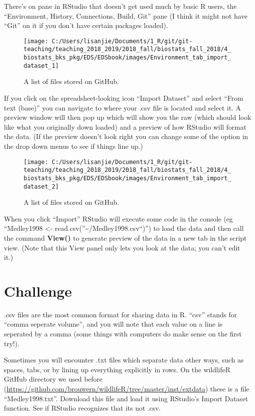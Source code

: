 \documentclass[]{book}
\theoremstyle{definition}
\theoremstyle{definition}
\theoremstyle{definition}
\theoremstyle{remark}
\begin{document}
There's on pane in RStudio that doesn't get used much by basic R users,
the ``Environment, History, Connections, Build, Git'' pane (I think it
might not have ``Git'' on it if you don't have certain packages loaded).

\begin{figure}
\texttt{[image: C:/Users/lisanjie/Documents/1\_R/git/git-teaching/teaching\_2018\_2019/2018\_fall/biostats\_fall\_2018/4\_biostats\_bks\_pkg/EDS/EDSbook/images/Environment\_tab\_import\_dataset\_1]} \caption{A list of files stored on GitHub.}\label{fig:unnamed-chunk-112}
\end{figure}

If you click on the spreadsheet-looking icon ``Import Dataset'' and
select ``From text (base)'' you can navigate to where your .csv file is
located and select it. A preview window will then pop up which will show
you the raw (which should look like what you originally down loaded) and
a preview of how RStudio will format the data. (If the preview doesn't
look right you can change some of the option in the drop down menus to
see if things line up.)

\begin{figure}
\texttt{[image: C:/Users/lisanjie/Documents/1\_R/git/git-teaching/teaching\_2018\_2019/2018\_fall/biostats\_fall\_2018/4\_biostats\_bks\_pkg/EDS/EDSbook/images/Environment\_tab\_import\_dataset\_2]} \caption{A list of files stored on GitHub.}\label{fig:unnamed-chunk-113}
\end{figure}

When you click ``Import'' RStudio will execute some code in the console
(eg ``Medley1998 \textless{}-
read.csv(''\textasciitilde{}/Medley1998.csv``)'') to load the data and
then call the command \textbf{View()} to generate preview of the data in
a new tab in the script view. (Note that this View panel only lets you
look at the data; you can't edit it.)

\section{Challenge}\label{challenge-2}

.csv files are the most common format for sharing data in R. ``csv''
stands for ``comma seperate volume'', and you will note that each value
on a line is seperated by a comma (some things with computers do make
sense on the first try!).

Sometimes you will encounter .txt files which separate data other ways,
such as spaces, tabs, or by lining up everything explicitly in rows. On
the wildlifeR GitHub directory we used before
(\url{https://github.com/brouwern/wildlifeR/tree/master/inst/extdata})
these is a file ``Medley1998.txt''. Download this file and load it using
RStudio's Import Dataset function. See if RStudio recognizes that its
not .csv.
\end{document}

